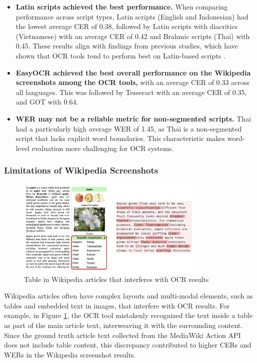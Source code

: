 \documentclass[12pt,oneside]{memoir}
\begin{document}
\begin{itemize}
    \item \textbf{Latin scripts achieved the best performance.} When comparing performance across script types, Latin scripts (English and Indonesian) had the lowest average CER of 0.38, followed by Latin scripts with diacritics (Vietnamese) with an average CER of 0.42 and Brahmic scripts (Thai) with 0.45. These results align with findings from previous studies, which have shown that OCR tools tend to perform best on Latin-based scripts \parencite{hegghammer-2022,ignat-etal-2022}.
    \item \textbf{EasyOCR achieved the best overall performance on the Wikipedia screenshots among the OCR tools,} with an average CER of 0.33 across all languages. This was followed by Tesseract with an average CER of 0.35, and GOT with 0.64. 
    \item \textbf{WER may not be a reliable metric for non-segmented scripts.} Thai had a particularly high average WER of 1.45, as Thai is a non-segmented script that lacks explicit word boundaries. This characteristic makes word-level evaluation more challenging for OCR systems.
\end{itemize}

\subsubsection{Limitations of Wikipedia Screenshots}

\begin{figure}[ht]
    \centering
    \includegraphics[width=0.8\textwidth]{images/wikipedia-limitations.png}
    \caption{Table in Wikipedia articles that interferes with OCR results}
    \label{figure:wikipedia-limitations}
\end{figure}

Wikipedia articles often have complex layouts and multi-modal elements, such as tables and embedded text in images, that interfere with OCR results.
For example, in Figure \ref{figure:wikipedia-limitations}, the OCR tool mistakenly recognized the text inside a table as part of the main article text, interweaving it with the surrounding content.
Since the ground truth article text collected from the MediaWiki Action API does not include table content, this discrepancy contributed to higher CERs and WERs in the Wikipedia screenshot results.
\end{document}

